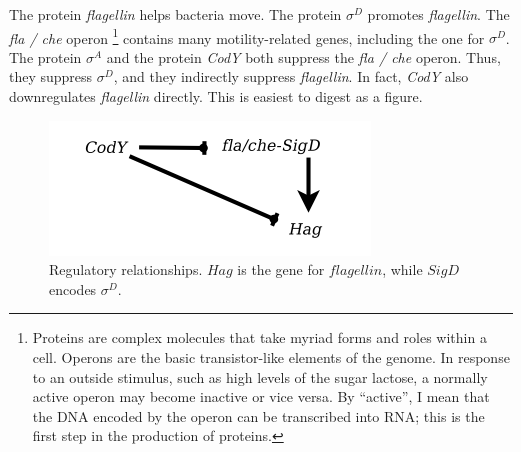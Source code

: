 \documentclass{article}
\begin{document}
The protein {\it flagellin} helps bacteria move. The protein $\sigma^D$ promotes {\it flagellin}. The {\it fla / che} operon \footnote{Proteins are complex molecules that take myriad forms and roles within a cell. Operons are the basic transistor-like elements of the genome. In response to an outside stimulus, such as high levels of the sugar lactose, a normally active operon may become inactive or vice versa. By ``active'', I mean that the DNA encoded by the operon can be transcribed into RNA; this is the first step in the production of proteins.} contains many motility-related genes, including the one for $\sigma^D$. The protein $\sigma^A$ and the protein {\it CodY} both suppress the {\it fla / che} operon. Thus, they suppress $\sigma^D$, and they indirectly suppress {\it flagellin}. In fact, {\it CodY} also downregulates {\it flagellin} directly. This is easiest to digest as a figure.

\begin{figure}[h!]
\begin{center}
\includegraphics[scale=0.5]{wilkinson_reg_network.png}
\caption{Regulatory relationships. $Hag$ is the gene for $flagellin$, while $SigD$ encodes $\sigma^D$.}
\end{center}
\label{fig:}
\end{figure}


%
% 
\end{document}
